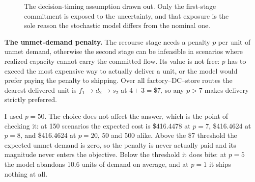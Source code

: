 \documentclass[11pt]{article}
\begin{document}
\begin{figure}[htbp]
\centering
{}
\caption{The decision-timing assumption drawn out. Only the first-stage
commitment is exposed to the uncertainty, and that exposure is the sole
reason the stochastic model differs from the nominal one.}
\end{figure}

\textbf{The unmet-demand penalty.}\quad
The recourse stage needs a penalty $p$ per unit of unmet demand,
otherwise the second stage can be infeasible in scenarios where realized
capacity cannot carry the committed flow. Its value is not free: $p$ has
to exceed the most expensive way to actually deliver a unit, or the model
would prefer paying the penalty to shipping. Over all factory--DC--store
routes the dearest delivered unit is $f_1 \to d_2 \to s_2$ at
$4 + 3 = \$7$, so any $p > 7$ makes delivery strictly preferred.

I used $p = 50$. The choice does not affect the answer, which is the
point of checking it: at 150 scenarios the expected cost is
\$416.4478 at $p = 7$, \$416.4624 at $p = 8$, and \$416.4624 at
$p = 20$, $50$ and $500$ alike. Above the \$7 threshold the expected
unmet demand is zero, so the penalty is never actually paid and its
magnitude never enters the objective. Below the threshold it does bite:
at $p = 5$ the model abandons 10.6 units of demand on average, and at
$p = 1$ it ships nothing at all.
\end{document}
